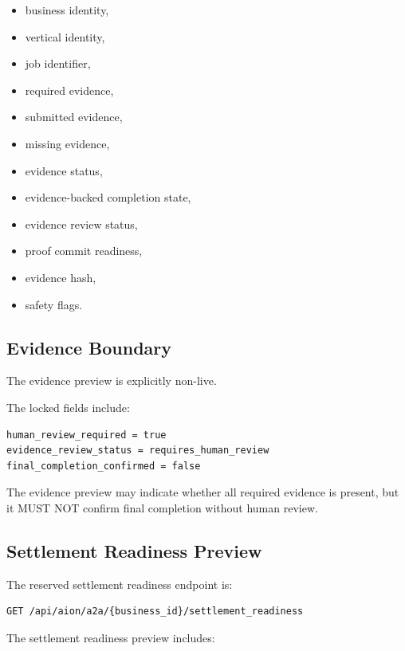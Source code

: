 \begin{itemize}
  \item business identity,
  \item vertical identity,
  \item job identifier,
  \item required evidence,
  \item submitted evidence,
  \item missing evidence,
  \item evidence status,
  \item evidence-backed completion state,
  \item evidence review status,
  \item proof commit readiness,
  \item evidence hash,
  \item safety flags.
\end{itemize}

\subsection{Evidence Boundary}

The evidence preview is explicitly non-live.

The locked fields include:

\begin{verbatim}
human_review_required = true
evidence_review_status = requires_human_review
final_completion_confirmed = false
\end{verbatim}

The evidence preview may indicate whether all required evidence is present, but it MUST NOT confirm final completion without human review.

\subsection{Settlement Readiness Preview}

The reserved settlement readiness endpoint is:

\begin{verbatim}
GET /api/aion/a2a/{business_id}/settlement_readiness
\end{verbatim}

The settlement readiness preview includes:

